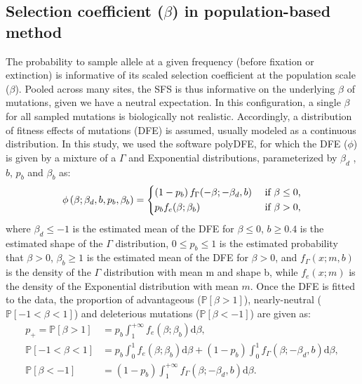\documentclass{article}
\newcommand{\der}{\textrm{d}}
\newcommand{\proba}{\mathbb{P}}
\newcommand{\Spop}{\beta}
\newcommand{\polyDel}{\Spop < -1}
\newcommand{\polyNeutral}{-1 < \Spop < 1}
\newcommand{\polyAdv}{ \Spop > 1}
\newcommand{\PpolyDel}{\proba \left[ \polyDel \right]}
\newcommand{\PpolyNeutral}{\proba \left[ \polyNeutral \right]}
\newcommand{\PpolyAdv}{\proba \left[ \polyAdv \right]}
\begin{document}
    \subsection{Selection coefficient ($\Spop$) in population-based method}
    \label{subsec:s-polymorphism-method}
    The probability to sample allele at a given frequency (before fixation or extinction) is informative of its scaled selection coefficient at the population scale ($\Spop$).
    Pooled across many sites, the SFS is thus informative on the underlying $\Spop$ of mutations, given we have a neutral expectation.
    In this configuration, a single $\Spop$ for all sampled mutations is biologically not realistic.
    Accordingly, a distribution of fitness effects of mutations (DFE) is assumed, usually modeled as a continuous distribution\cite{eyre-walker_distribution_2006, eyre-walker_estimating_2009}.
    In this study, we used the software polyDFE\cite{tataru_inference_2017, tataru_polydfe_2020}, for which the DFE ($\phi$) is given by a mixture of a $\Gamma$ and Exponential distributions, parameterized by $\Spop_d$ , $b$, $p_b$
    and $\Spop_b$ as:
    \begin{equation}
        \phi \left( \Spop; \Spop_d , b, p_b, \Spop_b \right) =
        \begin{dcases}
            \left( 1 - p_b \right) f_{\Gamma}(-\Spop; -\Spop_d, b) & \text{ if $\Spop \leq 0$,} \\
            p_b f_{e}(\Spop; \Spop_b) & \text{ if $\Spop > 0$,} \\
        \end{dcases}
    \end{equation}
    where $\Spop_d \leq -1 $ is the estimated mean of the DFE for $\Spop \leq 0$,
    $b \geq 0.4$ is the estimated shape of the $\Gamma$ distribution,
    $0 \leq p_b \leq 1$ is the estimated probability that $\Spop > 0$,
    $\Spop_b \geq 1$ is the estimated mean of the DFE for $\Spop > 0$,
    and $f_{\Gamma}(x; m, b)$ is the density of the $\Gamma$ distribution with mean m and shape b, while $f_{e}(x; m)$ is the density of the Exponential distribution with mean $m$.
    Once the DFE is fitted to the data, the proportion of advantageous ($\PpolyAdv$), nearly-neutral ($\PpolyNeutral$) and deleterious mutations ($\PpolyDel$) are given as:
    \begin{align}
        p_+ = \PpolyAdv &= p_b \int_{1}^{+\infty} f_{e}(\Spop; \Spop_b) \der \Spop,  \\
        \PpolyNeutral &= p_b \int_{0}^{1} f_{e}(\Spop; \Spop_b) \der \Spop + \left( 1 - p_b \right) \int_{0}^{1} f_{\Gamma}(\Spop; -\Spop_d, b) \der \Spop, \\
        \PpolyDel &= \left( 1 - p_b \right) \int_{1}^{+\infty} f_{\Gamma}(\Spop; -\Spop_d, b) \der \Spop.
    \end{align}
\end{document}
